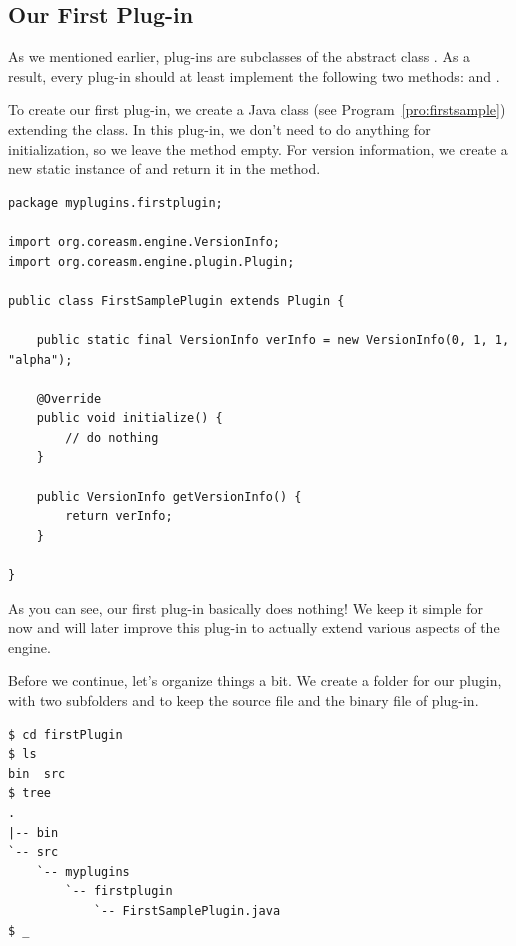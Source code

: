 \documentclass{article}
\begin{document}
\subsection{Our First Plug-in}

As we mentioned earlier, \CoreASM plug-ins are subclasses of the abstract class . 
As a result, every \CoreASM plug-in should at least implement the following two methods:  and . 

To create our first plug-in, we create a Java class
 (see
Program~\ref{pro:firstsample}) extending the  class. In this
plug-in, we don't need to do anything for initialization, so we leave the
method empty. For version information, we create a new static instance of
 and return it in the
 method. 

\begin{program}
\small
\begin{verbatim}
package myplugins.firstplugin;

import org.coreasm.engine.VersionInfo;
import org.coreasm.engine.plugin.Plugin;

public class FirstSamplePlugin extends Plugin {

    public static final VersionInfo verInfo = new VersionInfo(0, 1, 1, "alpha");
	
    @Override
    public void initialize() {
        // do nothing
    }

    public VersionInfo getVersionInfo() {
        return verInfo;
    }

}
\end{verbatim}
\caption{}
\label{pro:firstsample}
\end{program}

As you can see, our first plug-in basically does nothing! We keep it simple for now and will later  
improve this plug-in to actually extend various aspects of the engine.

Before we continue, let's organize things a bit. We create a folder for our plugin, with two subfolders
 and  to keep the source file and the binary file of plug-in. 
 
\begin{shell}
\begin{verbatim}
$ cd firstPlugin
$ ls
bin  src
$ tree
.
|-- bin
`-- src
    `-- myplugins
        `-- firstplugin
            `-- FirstSamplePlugin.java
$ _
\end{verbatim}
\end{shell}
\end{document}
